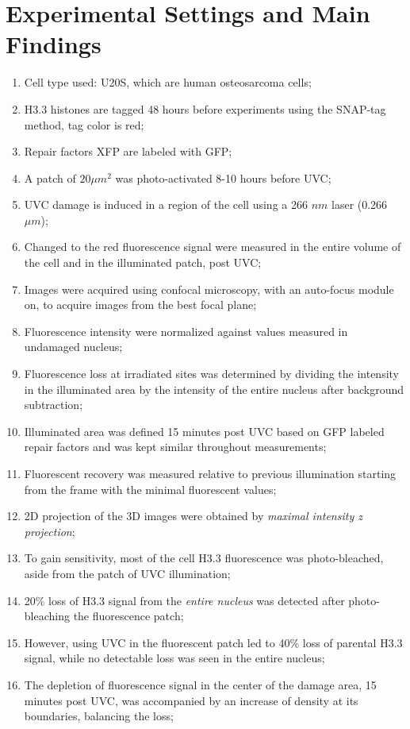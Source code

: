 \documentclass[12pt]{report}
\begin{document}
	\section{Experimental Settings and Main Findings}
	\begin{enumerate}
		\itemsep0em
		\item Cell type used: U20S, which are human osteosarcoma cells;
		\item H3.3 histones are tagged 48 hours before experiments using the SNAP-tag method, tag color is red;
		\item Repair factors XFP are labeled with GFP;
		\item A patch of $20 \mu m^2$ was photo-activated 8-10 hours before UVC;
		\item UVC damage is induced in a region of the cell using a 266 $nm$ laser (0.266 $\mu m$);
		\item Changed to the red fluorescence signal were measured in the entire volume of the cell and in the illuminated patch, post UVC;
		\item Images were acquired using confocal microscopy, with an auto-focus module on, to acquire images from the best focal plane;
		\item Fluorescence intensity were normalized against values measured in undamaged nucleus;
		\item Fluorescence loss at irradiated sites was determined by dividing the intensity in the illuminated area by the intensity of the entire nucleus after background subtraction;
		\item Illuminated area was defined 15 minutes post UVC based on GFP labeled repair factors and was kept similar throughout measurements;
		\item Fluorescent recovery was measured relative to previous illumination starting from the frame with the minimal fluorescent values;
		\item 2D projection of the 3D images were obtained by \textit{maximal intensity z projection};
		\item To gain sensitivity, most of the cell H3.3 fluorescence was photo-bleached, aside from the patch of UVC illumination;
		\item 20\% loss of H3.3 signal from the \textit{entire nucleus} was detected after photo-bleaching the fluorescence patch;
		\item However, using UVC in the fluorescent patch led to 40\% loss of parental H3.3 signal, while no detectable loss was seen in the entire nucleus;
		\item The depletion of fluorescence signal in the center of the damage area, 15 minutes post UVC, was accompanied by an increase of density at its boundaries, balancing the loss;

\end{enumerate}
\end{document}
